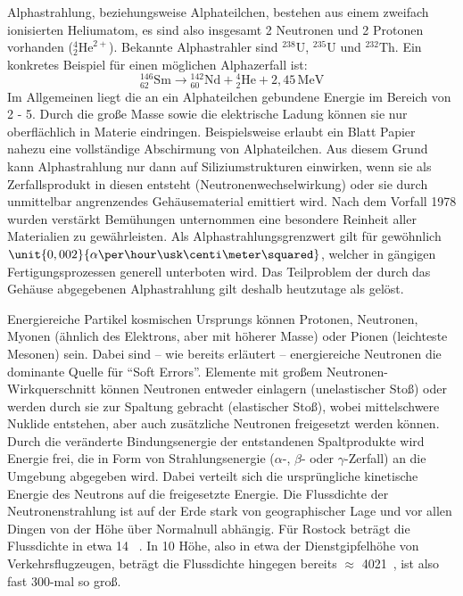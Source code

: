 Alphastrahlung, beziehungsweise Alphateilchen, bestehen aus einem zweifach
ionisierten Heliumatom, es sind also insgesamt 2 Neutronen
und 2 Protonen vorhanden ($\textstyle{{}^4_2\mathrm{He}^{2+}}$). Bekannte
Alphastrahler sind ${}^{238}\mathrm{U}$, ${}^{235}\mathrm{U}$ und
${}^{232}\mathrm{Th}$. Ein konkretes Beispiel für einen möglichen
Alphazerfall ist: \[{}^{146}_{62} \mathrm {Sm} \to {}^{142}_{60}
\mathrm {Nd} + {}^{4}_{2} \mathrm {He}  + 2{,}45\, \mathrm{MeV}\] Im
Allgemeinen liegt die an ein Alphateilchen gebundene Energie im
Bereich von 2 - \unit{5}{\mega\electronvolt}. Durch die große Masse
sowie die elektrische Ladung können sie nur oberflächlich in Materie
eindringen. Beispielsweise erlaubt ein Blatt Papier nahezu eine
vollständige Abschirmung von Alphateilchen. Aus diesem Grund kann
Alphastrahlung nur dann auf Siliziumstrukturen einwirken, wenn sie als
Zerfallsprodukt in diesen entsteht (Neutronenwechselwirkung) oder sie
durch unmittelbar angrenzendes Gehäusematerial emittiert wird. Nach
dem Vorfall 1978 wurden verstärkt Bemühungen unternommen eine
besondere Reinheit aller Materialien zu gewährleisten. Als
Alphastrahlungsgrenzwert gilt für gewöhnlich
$\unit{0,002}{\alpha\per\hour\usk\centi\meter\squared}$, welcher in
gängigen Fertigungsprozessen generell unterboten wird. Das Teilproblem
der durch das Gehäuse abgegebenen Alphastrahlung gilt deshalb
heutzutage als gelöst.

Energiereiche Partikel kosmischen Ursprungs können Protonen,
Neutronen, Myonen (ähnlich des Elektrons, aber mit höherer Masse) oder
Pionen (leichteste Mesonen) sein. Dabei  sind -- wie bereits erläutert
-- energiereiche Neutronen die dominante Quelle für ``Soft
Errors''. Elemente mit großem Neutronen-Wirkquerschnitt können
Neutronen entweder einlagern (unelastischer Stoß) oder werden durch
sie zur Spaltung gebracht (elastischer Stoß), wobei mittelschwere
Nuklide entstehen, aber auch zusätzliche Neutronen freigesetzt werden
können. Durch die veränderte Bindungsenergie der entstandenen
Spaltprodukte wird Energie frei, die in Form von Strahlungsenergie
($\alpha$-, $\beta$- oder $\gamma$-Zerfall) an die Umgebung abgegeben
wird. Dabei verteilt sich die ursprüngliche kinetische Energie des
Neutrons auf die freigesetzte Energie. Die Flussdichte der
Neutronenstrahlung ist auf der Erde stark von geographischer Lage und
vor allen Dingen von der Höhe über Normalnull abhängig. Für Rostock
beträgt die Flussdichte in etwa \unit{14
  }{\per\hour\usk\centi\meter\squared}
\cite{seutest}. In \unit{10}{\kilo\meter} Höhe, also in etwa der
Dienstgipfelhöhe von Verkehrsflugzeugen, beträgt die Flussdichte
hingegen bereits $\approx$ \unit{4021
  }{\per\hour\usk\centi\meter\squared}, ist also
fast 300-mal so groß.

